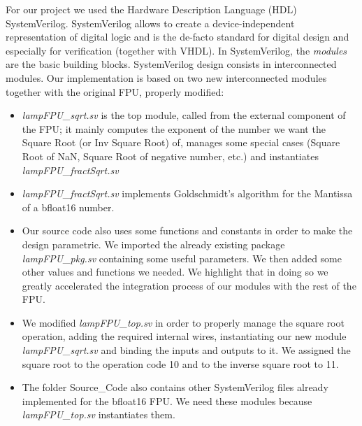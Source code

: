 For our project we used the Hardware Description Language (HDL) SystemVerilog. SystemVerilog allows to create a device-independent representation of digital logic and is the de-facto standard for digital design and especially for verification (together with VHDL). 
In SystemVerilog, the \emph{modules} are the basic building blocks. SystemVerilog design consists in interconnected modules.
Our implementation is based on two new interconnected modules together with the original FPU, properly modified:

\begin{itemize}
\item \emph{lampFPU\_sqrt.sv} is the top module, called from the external component of the FPU; it mainly computes the exponent of the number we want the Square Root (or Inv Square Root) of, manages some special cases (Square Root of NaN, Square Root of negative number, etc.) and instantiates \emph{lampFPU\_fractSqrt.sv}
\item \emph{lampFPU\_fractSqrt.sv} implements Goldschmidt's algorithm for the Mantissa of a bfloat16 number. 
\item Our source code also uses some functions and constants in order to make the design parametric. We imported the already existing package \emph{lampFPU\_pkg.sv} containing some useful parameters. We then added some other values and functions we needed. We highlight that in doing so we greatly accelerated the integration process of our modules with the rest of the FPU.
\item We modified \emph{lampFPU\_top.sv} in order to properly manage the square root operation, adding the required internal wires, instantiating our new module \emph{lampFPU\_sqrt.sv} and binding the inputs and outputs to it. We assigned the square root to the operation code 10 and to the inverse square root to 11. 
\item The folder Source\_Code also contains other SystemVerilog files already implemented for the bfloat16 FPU. We need these modules because \emph{lampFPU\_top.sv} instantiates them.
\end{itemize}

